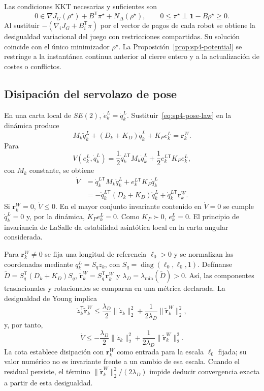 Las condiciones KKT necesarias y suficientes son
\[
 0\in\nabla J_G(\rho^\star)+B^{\mathsf T}\pi^\star
 +N_{\Delta}(\rho^\star),
 \qquad
 0\leq\pi^\star\perp\boldsymbol1-B\rho^\star\geq0.
\]
Al sustituir $-(\nabla_iJ_G+B_i^{\mathsf T}\pi)$ por el vector de pagos de cada robot se obtiene la desigualdad variacional del juego con restricciones compartidas. Su solución coincide con el único minimizador \(\rho^\star\). La Proposición~\ref{prop:sp4-potential} se restringe a la instantánea continua anterior al cierre entero y a la actualización de costes o conflictos.

\subsection{Disipación del servolazo de pose}
\label{app:sp4-pose-proof}

En una carta local de $SE(2)$, $\dot e_k^L=\dot q_k^L$. Sustituir~\eqref{eq:sp4-pose-law} en la dinámica produce
\[
 M_k\ddot q_k^L+(D_k+K_D)\dot q_k^L+K_Pe_k^L=\boldsymbol r_k^W.
\]
Para
\[
 V(e_k^L,\dot q_k^L)=
 \frac12\dot q_k^{L\mathsf T}M_k\dot q_k^L
 +\frac12e_k^{L\mathsf T}K_Pe_k^L,
\]
con $M_k$ constante, se obtiene
\begin{align*}
 \dot V
 &=\dot q_k^{L\mathsf T}M_k\ddot q_k^L
   +e_k^{L\mathsf T}K_P\dot q_k^L\\
 &=-\dot q_k^{L\mathsf T}(D_k+K_D)\dot q_k^L
   +\dot q_k^{L\mathsf T}\boldsymbol r_k^W.
\end{align*}
Si $\boldsymbol r_k^W=0$, $\dot V\leq0$. En el mayor conjunto invariante contenido en $\dot V=0$ se cumple $\dot q_k^L=0$ y, por la dinámica, $K_Pe_k^L=0$. Como $K_P\succ0$, $e_k^L=0$. El principio de invariancia de LaSalle da estabilidad asintótica local en la carta angular considerada.

Para $\boldsymbol r_k^W\neq0$ se fija una longitud de referencia
$\ell_0>0$ y se normalizan las coordenadas mediante
$q_k^L=S_qz_k$, con $S_q=\operatorname{diag}(\ell_0,\ell_0,1)$.
Defínanse
$\widetilde D=S_q^{\mathsf T}(D_k+K_D)S_q$,
$\widetilde{\boldsymbol r}_k^W=S_q^{\mathsf T}\boldsymbol r_k^W$ y
$\lambda_D=\lambda_{\min}(\widetilde D)>0$. Así, las componentes
traslacionales y rotacionales se comparan en una métrica declarada. La
desigualdad de Young implica
\[
 \dot z_k^{\mathsf T}\widetilde{\boldsymbol r}_k^W
 \leq\frac{\lambda_D}{2}\|\dot z_k\|_2^2
 +\frac{1}{2\lambda_D}\|\widetilde{\boldsymbol r}_k^W\|_2^2,
\]
y, por tanto,
\[
 \dot V\leq-\frac{\lambda_D}{2}\|\dot z_k\|_2^2
 +\frac{1}{2\lambda_D}\|\widetilde{\boldsymbol r}_k^W\|_2^2.
\]
La cota establece disipación con \(\boldsymbol r_k^W\) como entrada para la
escala $\ell_0$ fijada; su valor numérico no es invariante frente a un cambio de
esa escala. Cuando el residual persiste, el término
\(\|\widetilde{\boldsymbol r}_k^W\|_2^2/(2\lambda_D)\) impide deducir
convergencia exacta a partir de esta desigualdad.
